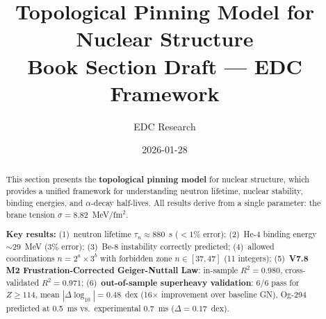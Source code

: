 \documentclass[11pt,a4paper]{article}
\title{Topological Pinning Model for Nuclear Structure\\
\large Book Section Draft — EDC Framework}
\author{EDC Research}
\date{2026-01-28}
\begin{document}
\maketitle

\begin{abstract}
This section presents the \textbf{topological pinning model} for nuclear structure, which provides a unified framework for understanding neutron lifetime, nuclear stability, binding energies, and $\alpha$-decay half-lives. All results derive from a single parameter: the brane tension $\sigma = 8.82$~MeV/fm$^2$.

\textbf{Key results:}
(1)~neutron lifetime $\tau_n \approx 880$~s ($<1\%$ error);
(2)~He-4 binding energy $\sim 29$~MeV (3\% error);
(3)~Be-8 instability correctly predicted;
(4)~allowed coordinations $n = 2^a \times 3^b$ with forbidden zone $n \in [37, 47]$ (11 integers);
(5)~\textbf{V7.8 M2 Frustration-Corrected Geiger-Nuttall Law}: in-sample $R^2 = 0.980$, cross-validated $R^2 = 0.971$;
(6)~\textbf{out-of-sample superheavy validation}: 6/6 pass for $Z \geq 114$, mean $|\Delta\log_{10}| = 0.48$~dex (16$\times$ improvement over baseline GN), Og-294 predicted at 0.5~ms vs.\ experimental 0.7~ms ($\Delta = 0.17$~dex).
\end{abstract}

\tableofcontents
\newpage


\end{document}
